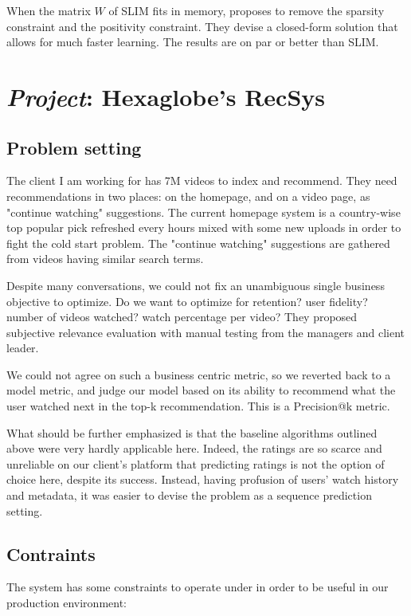When the matrix $W$ of SLIM fits in memory, \citet{easer} proposes to remove the sparsity constraint and the positivity constraint. They devise a closed-form solution that allows for much faster learning. The results are on par or better than SLIM.

\section{\arr \emph{Project}: Hexaglobe's RecSys}
\label{sec:our-recsys}
\subsection{Problem setting}

The client I am working for has 7M videos to index and recommend. They need recommendations in two places: on the homepage, and on a video page, as "continue watching" suggestions. The current homepage system is a country-wise top popular pick refreshed every hours mixed with some new uploads in order to fight the cold start problem. The "continue watching" suggestions are gathered from videos having similar search terms.

Despite many conversations, we could not fix an unambiguous single business objective to optimize. Do we want to optimize for retention? user fidelity? number of videos watched? watch percentage per video? They proposed subjective relevance evaluation with manual testing from the managers and client leader.

We could not agree on such a business centric metric, so we reverted back to a model metric, and judge our model based on its ability to recommend what the user watched next in the top-k recommendation. This is a Precision@k metric.

What should be further emphasized is that the baseline algorithms outlined above were very hardly applicable here. Indeed, the ratings are so scarce and unreliable on our client's platform that predicting ratings is not the option of choice here, despite its success. Instead, having profusion of users' watch history and metadata, it was easier to devise the problem as a sequence prediction setting.

\subsection{Contraints}

The system has some constraints to operate under in order to be useful in our production environment:

